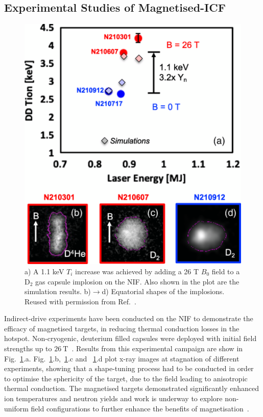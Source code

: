 \subsection{Experimental Studies of Magnetised-ICF}%
\label{sec:Res2_magicf_prevwork}

\begin{figure}[t!]
    \includegraphics[width=0.5\linewidth]{Results2/Images/magnif_yield_inc.png}
    \centering
    \caption{a) A 1.1 keV $T_i$ increase was achieved by adding a 26 T $B_0$ field to a D${}_{2}$ gas capsule implosion on the \ac{NIF}.
    Also shown in the plot are the simulation results.
    b)$\rightarrow$d) Equatorial shapes of the implosions.
    Reused with permission from Ref.~\cite{moody_increased_2022}.}%
    \label{fig:Res2_moody_magnif}
\end{figure}

Indirect-drive experiments have been conducted on the \ac{NIF} to demonstrate the efficacy of magnetised targets, in reducing thermal conduction losses in the hotspot.
Non-cryogenic, deuterium filled capsules were deployed with initial field strengths up to $26\ \text{T}$~\cite{moody_increased_2022}.
Results from this experimental campaign are show in Fig.~\ref{fig:Res2_moody_magnif}.a.
Fig.~\ref{fig:Res2_moody_magnif}.b,~\ref{fig:Res2_moody_magnif}.c and ~\ref{fig:Res2_moody_magnif}.d plot x-ray images at stagnation of different experiments, showing that a shape-tuning process had to be conducted in order to optimise the sphericity of the target, due to the field leading to anisotropic thermal conduction.
The magnetised targets demonstrated significantly enhanced ion temperatures and neutron yields and work is underway to explore non-uniform field configurations to further enhance the benefits of magnetisation~\cite{walsh_application_2023}.

